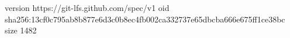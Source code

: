 version https://git-lfs.github.com/spec/v1
oid sha256:13cf0c795ab8b877e6d3c0b8ec4fb002ca332737e65dbcba666e675ff1ce38bc
size 1482
